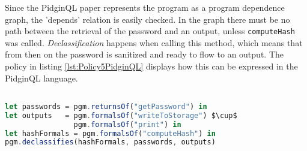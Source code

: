 Since the PidginQL paper represents the program as a program dependence graph, the 'depends' relation is easily checked. In the graph there must be no path between the retrieval of the password and an output, unless \texttt{computeHash} was called. \textit{Declassification} happens when calling this method, which means that from then on the password is sanitized and ready to flow to an output. The policy in listing \ref{lst:Policy5PidginQL} displays how this can be expressed in the PidginQL language.

\begin{lstlisting}[label={lst:Policy5PidginQL},language=JavaScript,caption=Policy 5 in PidginQL,mathescape=true]  % float=t?

let passwords = pgm.returnsOf("getPassword") in 
let outputs   = pgm.formalsOf("writeToStorage") $\cup$
                pgm.formalsOf("print") in
let hashFormals = pgm.formalsOf("computeHash") in
pgm.declassifies(hashFormals, passwords, outputs)
\end{lstlisting}

